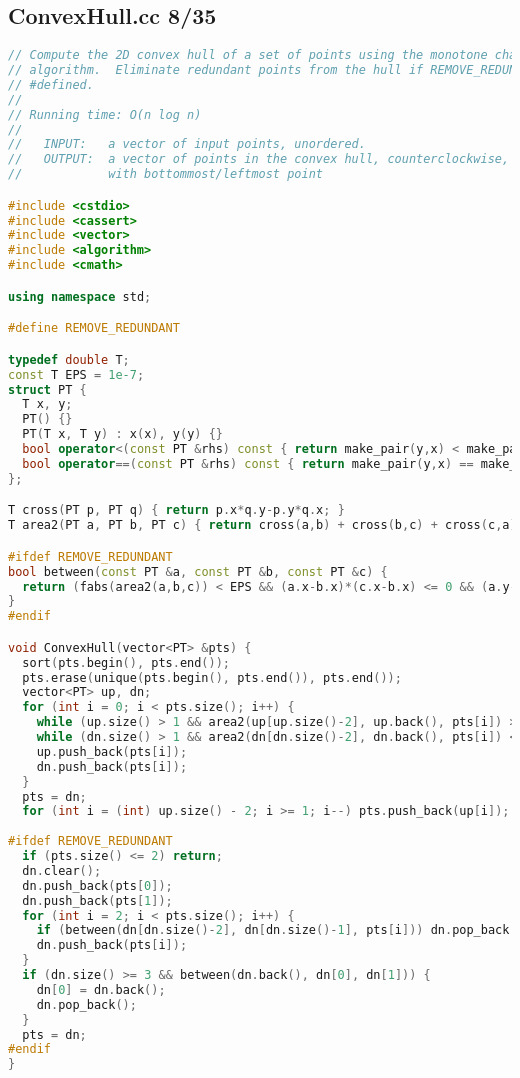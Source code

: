 \subsection{ConvexHull.cc 8/35}
\begin{lstlisting}[language=C++]
// Compute the 2D convex hull of a set of points using the monotone chain
// algorithm.  Eliminate redundant points from the hull if REMOVE_REDUNDANT is 
// #defined.
//
// Running time: O(n log n)
//
//   INPUT:   a vector of input points, unordered.
//   OUTPUT:  a vector of points in the convex hull, counterclockwise, starting
//            with bottommost/leftmost point

#include <cstdio>
#include <cassert>
#include <vector>
#include <algorithm>
#include <cmath>

using namespace std;

#define REMOVE_REDUNDANT

typedef double T;
const T EPS = 1e-7;
struct PT { 
  T x, y; 
  PT() {} 
  PT(T x, T y) : x(x), y(y) {}
  bool operator<(const PT &rhs) const { return make_pair(y,x) < make_pair(rhs.y,rhs.x); }
  bool operator==(const PT &rhs) const { return make_pair(y,x) == make_pair(rhs.y,rhs.x); }
};

T cross(PT p, PT q) { return p.x*q.y-p.y*q.x; }
T area2(PT a, PT b, PT c) { return cross(a,b) + cross(b,c) + cross(c,a); }

#ifdef REMOVE_REDUNDANT
bool between(const PT &a, const PT &b, const PT &c) {
  return (fabs(area2(a,b,c)) < EPS && (a.x-b.x)*(c.x-b.x) <= 0 && (a.y-b.y)*(c.y-b.y) <= 0);
}
#endif

void ConvexHull(vector<PT> &pts) {
  sort(pts.begin(), pts.end());
  pts.erase(unique(pts.begin(), pts.end()), pts.end());
  vector<PT> up, dn;
  for (int i = 0; i < pts.size(); i++) {
    while (up.size() > 1 && area2(up[up.size()-2], up.back(), pts[i]) >= 0) up.pop_back();
    while (dn.size() > 1 && area2(dn[dn.size()-2], dn.back(), pts[i]) <= 0) dn.pop_back();
    up.push_back(pts[i]);
    dn.push_back(pts[i]);
  }
  pts = dn;
  for (int i = (int) up.size() - 2; i >= 1; i--) pts.push_back(up[i]);
  
#ifdef REMOVE_REDUNDANT
  if (pts.size() <= 2) return;
  dn.clear();
  dn.push_back(pts[0]);
  dn.push_back(pts[1]);
  for (int i = 2; i < pts.size(); i++) {
    if (between(dn[dn.size()-2], dn[dn.size()-1], pts[i])) dn.pop_back();
    dn.push_back(pts[i]);
  }
  if (dn.size() >= 3 && between(dn.back(), dn[0], dn[1])) {
    dn[0] = dn.back();
    dn.pop_back();
  }
  pts = dn;
#endif
}

\end{lstlisting}
